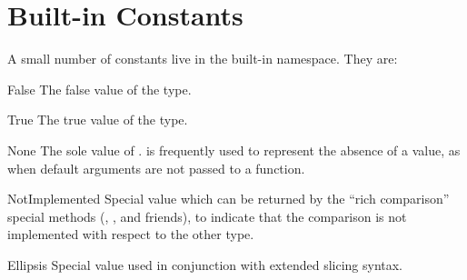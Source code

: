 \section{Built-in Constants}

A small number of constants live in the built-in namespace.  They are:

\begin{datadesc}{False}
  The false value of the  type.
\end{datadesc}

\begin{datadesc}{True}
  The true value of the  type.
\end{datadesc}

\begin{datadesc}{None}
  The sole value of .   is
  frequently used to represent the absence of a value, as when default
  arguments are not passed to a function.
\end{datadesc}

\begin{datadesc}{NotImplemented}
  Special value which can be returned by the ``rich comparison''
  special methods (, , and friends),
  to indicate that the comparison is not implemented with respect to
  the other type.
\end{datadesc}

\begin{datadesc}{Ellipsis}
  Special value used in conjunction with extended slicing syntax.
\end{datadesc}
